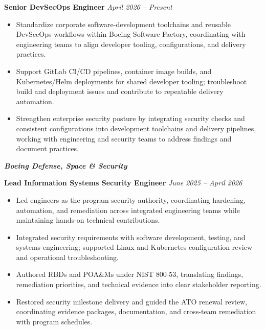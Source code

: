 \documentclass[10.5pt, letterpaper]{article}
\begin{document}
\vspace{1pt}
\textbf{Senior DevSecOps Engineer} \hfill \textit{April 2026 -- Present}
\begin{itemize}
  \item Standardize corporate software-development toolchains and reusable DevSecOps workflows within Boeing Software Factory, coordinating with engineering teams to align developer tooling, configurations, and delivery practices.
  \item Support GitLab CI/CD pipelines, container image builds, and Kubernetes/Helm deployments for shared developer tooling; troubleshoot build and deployment issues and contribute to repeatable delivery automation.
  \item Strengthen enterprise security posture by integrating security checks and consistent configurations into development toolchains and delivery pipelines, working with engineering and security teams to address findings and document practices.
\end{itemize}

\vspace{8pt}
\textbf{\textit{Boeing Defense, Space \& Security}}

\vspace{1pt}
\textbf{Lead Information Systems Security Engineer} \hfill \textit{June 2025 -- April 2026}
\begin{itemize}
  \item Led engineers as the program security authority, coordinating hardening, automation, and remediation across integrated engineering teams while maintaining hands-on technical contributions.
  \item Integrated security requirements with software development, testing, and systems engineering; supported Linux and Kubernetes configuration review and operational troubleshooting.
  \item Authored RBDs and POA\&Ms under NIST 800-53, translating findings, remediation priorities, and technical evidence into clear stakeholder reporting.
  \item Restored security milestone delivery and guided the ATO renewal review, coordinating evidence packages, documentation, and cross-team remediation with program schedules.
\end{itemize}
\end{document}
